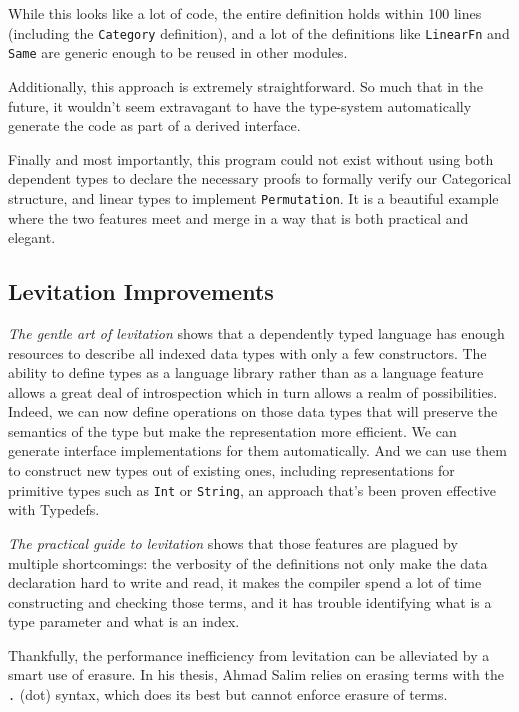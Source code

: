 \documentclass[
]{article}
\begin{document}
While this looks like a lot of code, the entire definition holds within
100 lines (including the \texttt{Category} definition), and a lot of the
definitions like \texttt{LinearFn} and \texttt{Same} are generic enough
to be reused in other modules.

Additionally, this approach is extremely straightforward. So much that
in the future, it wouldn't seem extravagant to have the type-system
automatically generate the code as part of a derived interface.

Finally and most importantly, this program could not exist without using
both dependent types to declare the necessary proofs to formally verify
our Categorical structure, and linear types to implement
\texttt{Permutation}. It is a beautiful example where the two features
meet and merge in a way that is both practical and elegant.

\hypertarget{levitation-improvements}{%
\subsection{Levitation Improvements}\label{levitation-improvements}}

\emph{The gentle art of levitation}\cite{levitation} shows that a
dependently typed language has enough resources to describe all indexed
data types with only a few constructors. The ability to define types as
a language library rather than as a language feature allows a great deal
of introspection which in turn allows a realm of possibilities. Indeed,
we can now define operations on those data types that will preserve the
semantics of the type but make the representation more efficient. We can
generate interface implementations for them automatically. And we can
use them to construct new types out of existing
ones\cite{category_of_containers}\cite{delta_for_data}\cite{indexed_containers},
including representations for primitive types such as \texttt{Int} or
\texttt{String}, an approach that's been proven effective with
Typedefs\cite{typedefs}.

\emph{The practical guide to levitation}\cite{levitation} shows that
those features are plagued by multiple shortcomings: the verbosity of
the definitions not only make the data declaration hard to write and
read, it makes the compiler spend a lot of time constructing and
checking those terms, and it has trouble identifying what is a type
parameter and what is an index.

Thankfully, the performance inefficiency from levitation can be
alleviated by a smart use of erasure. In his thesis, Ahmad Salim relies
on erasing terms with the \texttt{.} (dot) syntax, which does its best
but cannot enforce erasure of terms.
\end{document}
